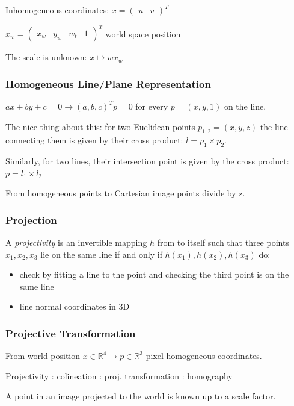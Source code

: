 Inhomogeneous coordinates: $x = (\begin{matrix} u & v \end{matrix})^T $

$ x_w = \left( \begin{matrix} x_w &  y_w & w_t & 1 \end{matrix} \right)^T $ world space position

The scale is unknown: $x \mapsto  w x_w$

\subsubsection{Homogeneous Line/Plane Representation}

$ax+by+c = 0 \to (a,b,c)^T p = 0$ for every $p = (x,y,1)$ on the line.

The nice thing about this: for two Euclidean points $p_{1,2} = (x,y,z) $ the line connecting them is given by their cross product: $l = p_1 \times p_2$. 

Similarly, for two lines, their intersection point is given by the cross product: 
$p = l_1 \times l_2$

From homogeneous points to Cartesian image points divide by z. 


\subsubsection{Projection}

A \emph{projectivity} is an invertible mapping $h$ from  to itself such that three points $x_1 , x_2 , x_3$ lie on the same line if and only if $h(x_1), h(x_2 ), h(x_3)$ do:
%
\begin{itemize}
\item check by fitting a line to the point and checking the third point is on the same line
\item line normal coordinates in 3D
\end{itemize}

\subsubsection{Projective Transformation}

From world position $x \in \mathbb{R}^4 \to p \in \mathbb R^3$ pixel homogeneous coordinates. 

Projectivity : colineation :  proj. transformation : homography

A point in an image projected to the world is known up to a scale factor.

